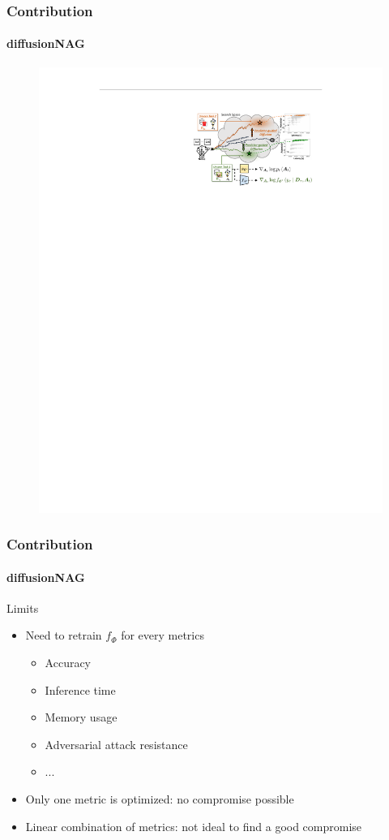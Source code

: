 \documentclass[aspectratio=169,xcolor=dvipsnames]{beamer}
\begin{document}
\begin{frame}
    \frametitle{Contribution}
    \framesubtitle{diffusionNAG}
    \begin{figure}[htbp]
        \centering
        \includegraphics[height=.80\textheight]{diffusionNAG_part2.pdf}
    \end{figure}
\end{frame}
\begin{frame}
    \frametitle{Contribution}
    \framesubtitle{diffusionNAG}
    Limits
    \begin{itemize}
        \item Need to retrain $ f_\Phi $ for every metrics
            \begin{itemize}
                \item Accuracy
                \item Inference time
                \item Memory usage
                \item Adversarial attack resistance
                \item ...
            \end{itemize}
        \item Only one metric is optimized: no compromise possible
        \item Linear combination of metrics: not ideal to find a good compromise
    \end{itemize}
\end{frame}
\end{document}
